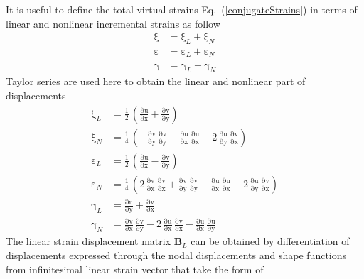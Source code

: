 It is useful to define the total virtual strains Eq.~(\ref{conjugateStrains}) in terms of linear and nonlinear incremental strains as follow
\begin{subequations}
	\begin{align}
	\mathrm  \xi & =\mathrm \xi_{L}+\mathrm  \xi_{N}\\
	\mathrm  \varepsilon & =\mathrm  \varepsilon_{L}+\mathrm  \varepsilon_{N}\\
	\mathrm \gamma & =\mathrm  \gamma_{L}+\mathrm  \gamma_{N}
	\end{align}
	\label{totalvirtualstrain}
\end{subequations}
Taylor series are used here to obtain the linear and nonlinear part of displacements 
\begin{subequations}
	\begin{align}
	\mathrm \xi_{L} & =\frac{1}{2}\, \left(\mathrm{\frac{\partial u}{\partial x}} + \mathrm{\frac{\partial v}{\partial y}}\right)\\
	\mathrm \xi_{N} & = \frac{1}{4}\, \left(- \mathrm{\frac{ \partial v}{\partial y}}\, \mathrm{\frac{ \partial v}{\partial y}} -\mathrm{\frac{\partial u}{\partial x}}\, \mathrm{\frac{\partial u}{\partial x}} - 2 \, \mathrm{\frac{\partial u}{\partial y}}\, \mathrm{\frac{\partial v}{\partial x}}\right)\\
	\mathrm \varepsilon_{L} & =\frac{1}{2}\, \left(\mathrm{\frac{\partial u}{\partial x}} - \mathrm{\frac{\partial v}{\partial y}}\right)\\
	\mathrm \varepsilon_{N} & = \frac{1}{4}\, \left(2 \, \mathrm{\frac{\partial v}{\partial x}}\, \mathrm{\frac{\partial v}{\partial x}} + \mathrm{\frac{ \partial v}{\partial y}}\, \mathrm{\frac{ \partial v}{\partial y}} -\mathrm{\frac{\partial u}{\partial x}}\, \mathrm{\frac{\partial u}{\partial x}} + 2 \, \mathrm{\frac{\partial u}{\partial y}}\, \mathrm{\frac{\partial v}{\partial x}}\right)\\
	\mathrm \gamma_{L} & = \mathrm{\frac{\partial u}{\partial y}} + \mathrm{\frac{\partial v}{\partial x}}\\
	\mathrm \gamma_{N} & = \mathrm{\frac{\partial v}{\partial x}}\, \mathrm{\frac{\partial v}{\partial y}} - 2\, \mathrm{\frac{ \partial u}{\partial x}}\, \mathrm{\frac{ \partial v}{\partial x}} 
	-\mathrm{\frac{\partial u}{\partial x}}\, \mathrm{\frac{\partial u}{\partial y}}
	\end{align}
\end{subequations}
The linear strain displacement matrix $\mathbf{B}_L$ can be obtained by differentiation of displacements expressed through the nodal displacements and shape functions from infinitesimal linear strain vector that take the form of
